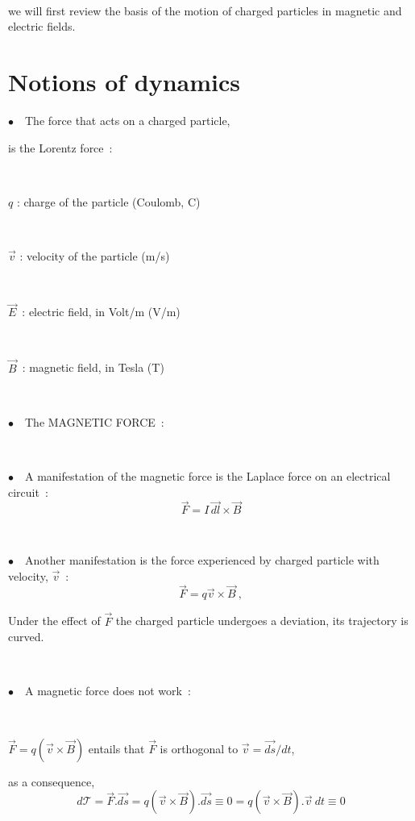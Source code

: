 \documentclass[12pt]{paper}
\newcommand{\B}{\ensuremath{\vec B}}
\newcommand{\ds}{\ensuremath{\vec {ds}}}
\newcommand{\F}{\ensuremath{\vec F}}
\newcommand{\nib}{\noindent $\bullet$~}
\newcommand{\nin}{\noindent}
\newcommand{\vv}{\ensuremath{\vec v}}
\newcommand{\blue}{\color{blue}}
\begin{document}
~

we will first review 
the basis of the motion of charged particles in  magnetic and electric fields. 



\clearpage 

\section*{ \LARGE Notions of dynamics}

\nib\ The force that acts on a charged particle, 

\hfill is the Lorentz force~:  {\blue  \LARGE {} } \hfill ~ 

~

$q$ : charge of the particle (Coulomb, C)

~

$\vv$ : velocity of the particle (m/s)

~

$\vec E$~: electric field, in Volt/m (V/m)

~

$\vec B$~: magnetic field, in Tesla (T)


~





\clearpage



{\blue \nib\ The MAGNETIC FORCE~: }
  
~


\nib\ A manifestation of the magnetic force is  the Laplace force on an electrical circuit~: 
$$\vec F = I \, \vec{dl} \times \vec B$$


~

\nib\ Another manifestation is the force experienced by  charged particle with  velocity, $\vv$~: 
$$\F = q \vv \times \B ~ , $$

\nin Under the effect of $\F$ the charged particle undergoes a deviation, its trajectory is curved. 


~

\nib\ A magnetic force does not work~: 

~

$\F  = q (\vv \times \B) $ entails  that $\F $ is orthogonal to $\vv = \ds / dt$, 

as a consequence,  
$$d\mathcal{T} = \F  . \ds = q (\vv \times \B) . \ds \equiv 0  = q (\vv \times \B) . \vv \ dt \equiv 0 $$
\end{document}
